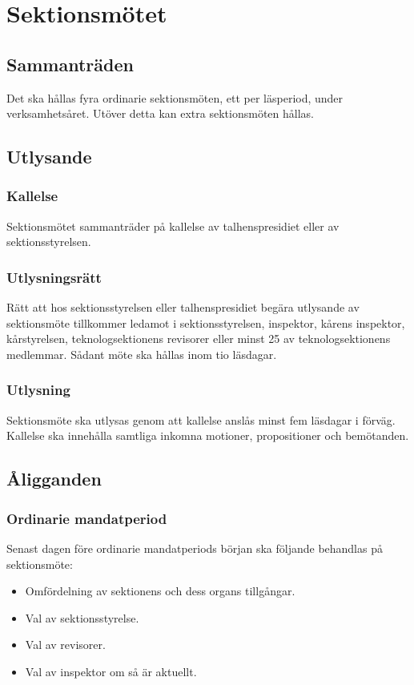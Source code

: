 \documentclass[a4paper]{dtek}
\begin{document}
\section{Sektionsmötet}
\subsection{Sammanträden}
Det ska hållas fyra ordinarie sektionsmöten, ett per läsperiod, under verksamhetsåret. Utöver detta kan extra sektionsmöten hållas.
\subsection{Utlysande}
\subsubsection{Kallelse}
Sektionsmötet sammanträder på kallelse av talhenspresidiet eller av sektionsstyrelsen.
\subsubsection{Utlysningsrätt}
Rätt att hos sektionsstyrelsen eller talhenspresidiet begära utlysande av sektionsmöte tillkommer ledamot i sektionsstyrelsen, inspektor, kårens inspektor, kårstyrelsen, teknologsektionens revisorer eller minst 25 av teknologsektionens medlemmar. Sådant möte ska hållas inom tio läsdagar.
\subsubsection{Utlysning}
\label{sec:sektionsmote_utlysande}
Sektionsmöte ska utlysas genom att kallelse anslås minst fem läsdagar i förväg.
Kallelse ska innehålla samtliga inkomna motioner, propositioner och bemötanden.
\subsection{Åligganden}
\subsubsection{Ordinarie mandatperiod}
Senast dagen före ordinarie mandatperiods början ska följande behandlas på sektionsmöte:
\begin{itemize}
\item Omfördelning av sektionens och dess organs tillgångar.
\item Val av sektionsstyrelse.
\item Val av revisorer.
\item Val av inspektor om så är aktuellt.
\end{itemize}
\end{document}
